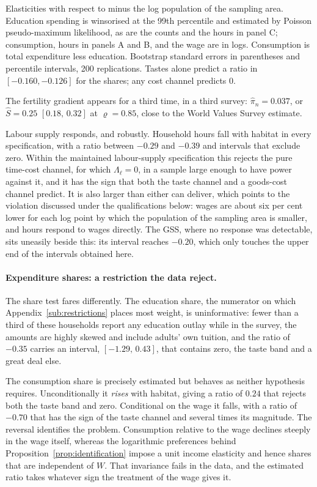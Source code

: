 \documentclass[11pt]{article}
\begin{document}
\begin{table}[h!]
\begin{threeparttable}
\begin{tablenotes}
\item Elasticities with respect to minus the log population of the sampling area. Education
spending is winsorised at the 99th percentile and estimated by Poisson pseudo-maximum likelihood,
as are the counts and the hours in panel C; consumption, hours in panels A and B, and the wage are
in logs. Consumption is total expenditure less education. Bootstrap standard errors in
parentheses and percentile intervals, 200 replications. Tastes alone predict a ratio in
$[-0.160,-0.126]$ for the shares; any cost channel predicts $0$.
\end{tablenotes}
\end{threeparttable}
\end{table}

The fertility gradient appears for a third time, in a third survey: $\hat\pi_n=0.037$, or
$\hat S=0.25$ $[0.18,\,0.32]$ at $\varrho=0.85$, close to the World Values Survey estimate.

Labour supply responds, and robustly. Household hours fall with habitat in every specification,
with a ratio between $-0.29$ and $-0.39$ and intervals that exclude zero. Within the maintained
labour-supply specification this rejects the pure time-cost channel, for which $\Lambda_\ell=0$, in a
sample large enough to have power against it,
and it has the sign that both the taste channel and a goods-cost channel predict. It is also
larger than either can deliver, which points to the violation discussed under the qualifications
below: wages are about six per cent lower for each log point by which the population of the sampling
area is smaller, and hours respond to wages directly.
The GSS, where no response was detectable, sits uneasily beside this: its interval reaches
$-0.20$, which only touches the upper end of the intervals obtained here.

\paragraph{Expenditure shares: a restriction the data reject.}
The share test fares differently. The education share, the numerator on which
Appendix~\ref{sub:restrictions} places most weight, is uninformative: fewer than a third of these
households report any education outlay while in the survey, the amounts are highly skewed and
include adults' own tuition, and the ratio of $-0.35$ carries an interval, $[-1.29,\,0.43]$, that
contains zero, the taste band and a great deal else.

The consumption share is precisely estimated but behaves as neither hypothesis requires.
Unconditionally it \emph{rises} with habitat, giving a ratio of $0.24$ that rejects both the taste
band and zero. Conditional on the wage it falls, with a ratio of $-0.70$ that has the sign of the
taste channel and several times its magnitude. The reversal identifies the problem. Consumption
relative to the wage declines steeply in the wage itself, whereas the logarithmic preferences
behind Proposition~\ref{prop:identification} impose a unit income elasticity and hence shares that
are independent of $W$. That invariance fails in the data, and the estimated ratio takes whatever
sign the treatment of the wage gives it.
\end{document}
